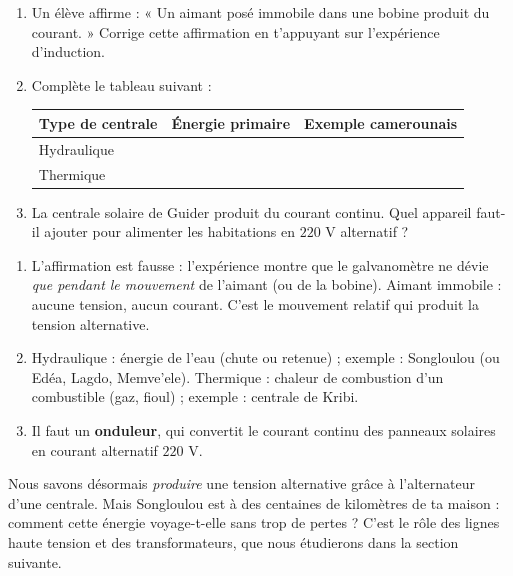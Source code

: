 \documentclass[11pt]{article}
\begin{document}
\begin{exercice}
\begin{enumerate}
\item Un élève affirme : « Un aimant posé immobile dans une bobine produit du courant. » Corrige cette affirmation en t'appuyant sur l'expérience d'induction.
\item Complète le tableau suivant :
\begin{center}
\begin{tabularx}{\linewidth}{|l|X|X|}
\hline
\rowcolor{popblueL} \textbf{Type de centrale} & \textbf{Énergie primaire} & \textbf{Exemple camerounais} \\
\hline
Hydraulique & & \\
\hline
Thermique & & \\
\hline
\end{tabularx}
\end{center}
\item La centrale solaire de Guider produit du courant continu. Quel appareil faut-il ajouter pour alimenter les habitations en $220$ V alternatif ?
\end{enumerate}
\end{exercice}

\begin{corrige}
\begin{enumerate}
\item L'affirmation est fausse : l'expérience montre que le galvanomètre ne dévie \emph{que pendant le mouvement} de l'aimant (ou de la bobine). Aimant immobile : aucune tension, aucun courant. C'est le mouvement relatif qui produit la tension alternative.
\item Hydraulique : énergie de l'eau (chute ou retenue) ; exemple : Songloulou (ou Edéa, Lagdo, Memve'ele). Thermique : chaleur de combustion d'un combustible (gaz, fioul) ; exemple : centrale de Kribi.
\item Il faut un \textbf{onduleur}, qui convertit le courant continu des panneaux solaires en courant alternatif $220$ V.
\end{enumerate}
\end{corrige}

Nous savons désormais \emph{produire} une tension alternative grâce à l'alternateur d'une centrale. Mais Songloulou est à des centaines de kilomètres de ta maison : comment cette énergie voyage-t-elle sans trop de pertes ? C'est le rôle des lignes haute tension et des transformateurs, que nous étudierons dans la section suivante.
\end{document}
